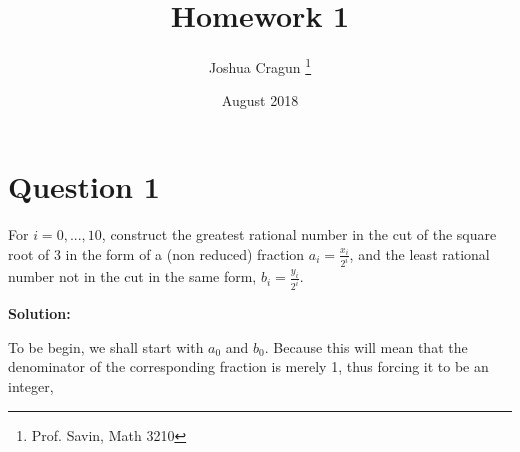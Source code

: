 \documentclass[12pt, letterpaper]{article}
\title{Homework 1}
\author{Joshua Cragun \thanks{Prof. Savin, Math 3210}}
\date{August 2018}
\begin{document}
\begin{titlepage}
\maketitle
\end{titlepage}

\section{Question 1}
For $i = 0, ..., 10$, construct the greatest rational number in the cut of the
square root of $3$ in the form of a (non reduced) fraction $a_i = \frac{x_i}{2^i}$,
and the least rational number not in the cut in the same form, $b_i = \frac{y_i}{2^i}$.

\noindent\textbf{Solution:}

To be begin, we shall start with $a_0$ and $b_0$. Because this will mean that the
 denominator of the corresponding fraction is merely 1, thus forcing it to be an
 integer, 
\end{document}
